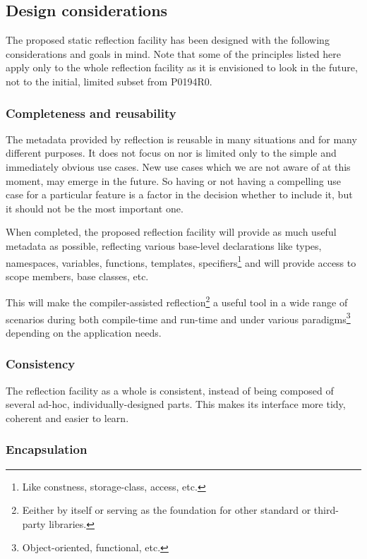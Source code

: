 \subsection{Design considerations}

The proposed static reflection facility has been designed with the following
considerations and goals in mind. 
Note that some of the principles listed here
apply only to the whole reflection facility as it is envisioned
to look in the future, not to the initial, limited subset from P0194R0.

\subsubsection{Completeness and reusability}
\label{design-completeness}

The metadata provided by reflection is reusable in many situations
and for many different purposes.
It does not focus on nor is limited only to the simple and immediately obvious
use cases. New use cases which we are not aware of at this moment, may emerge
in the future. So having or not having a compelling use case for a particular
feature is a factor in the decision whether to include it, but it should
not be the most important one.

When completed, the proposed reflection facility will provide as much useful
metadata as possible, reflecting various base-level
declarations like types, namespaces, variables, functions, templates,
specifiers\footnote{Like constness, storage-class, access, etc.} and
will provide access to scope members, base classes, etc.

This will make the compiler-assisted reflection\footnote{Eeither by itself or
serving as the foundation for other standard or third-party libraries.} a useful
tool in a wide range of scenarios during both compile-time
and run-time and under various paradigms\footnote{Object-oriented, functional,
etc.} depending on the application needs.

\subsubsection{Consistency}
\label{design-consistency}

The reflection facility as a whole is consistent, instead of being
composed of several ad-hoc, individually-designed parts. This makes
its interface more tidy, coherent and easier to learn.

\subsubsection{Encapsulation}
\label{design-encapsulation}

